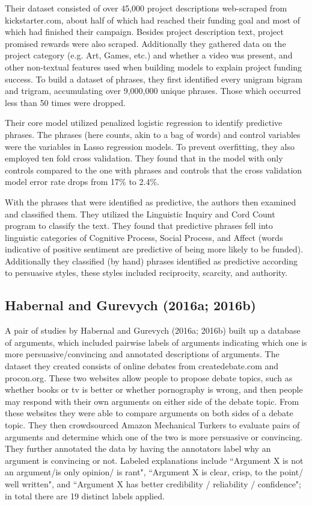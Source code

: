 \documentclass[11pt,a4paper]{article}
\begin{document}
Their dataset consisted of over 45,000 project descriptions web-scraped from kickstarter.com, about half of which had reached their funding goal and most of which had finished their campaign. Besides project description text, project promised rewards were also scraped. Additionally they gathered data on the project category (e.g. Art, Games, etc.) and whether a video was present, and other non-textual features used when building models to explain project funding success. To build a dataset of phrases, they first identified every unigram bigram and trigram, accumulating over 9,000,000 unique phrases. Those which occurred less than 50 times were dropped. 

Their core model utilized penalized logistic regression to identify predictive phrases. The phrases (here counts, akin to a bag of words) and control variables were the variables in Lasso regression models. To prevent overfitting, they also employed ten fold cross validation. They found that in the model with only controls compared to the one with phrases and controls that the cross validation model error rate drops from 17\% to 2.4\%.

With the phrases that were identified as predictive, the authors then examined and classified them. They utilized the Linguistic Inquiry and Cord Count program to classify the text. They found that predictive phrases fell into linguistic categories of Cognitive Process, Social Process, and Affect (words indicative of positive sentiment are predictive of being more likely to be funded). Additionally they classified (by hand) phrases identified as predictive according to persuasive styles, these styles included  reciprocity, scarcity, and authority.

\subsection{Habernal and Gurevych (2016a; 2016b)}
A pair of studies by Habernal and Gurevych (2016a; 2016b) built up a database of arguments, which included pairwise labels of arguments indicating which one is more persuasive/convincing and annotated descriptions of arguments. The dataset they created consists of online debates from createdebate.com and procon.org. These two websites allow people to propose debate topics, such as whether books or tv is better or whether pornography is wrong, and then people may respond with their own arguments on either side of the debate topic. From these websites they were able to compare arguments on both sides of a debate topic. They then crowdsourced Amazon Mechanical Turkers to evaluate pairs of arguments and determine which one of the two is more persuasive or convincing. They further annotated the data by having the annotators label why an argument is convincing or not. Labeled explanations include ``Argument X is not an argument/is only opinion/ is rant", ``Argument X is clear, crisp, to the point/ well written", and ``Argument X has better credibility / reliability / confidence"; in total there are 19 distinct labels applied.
\end{document}
